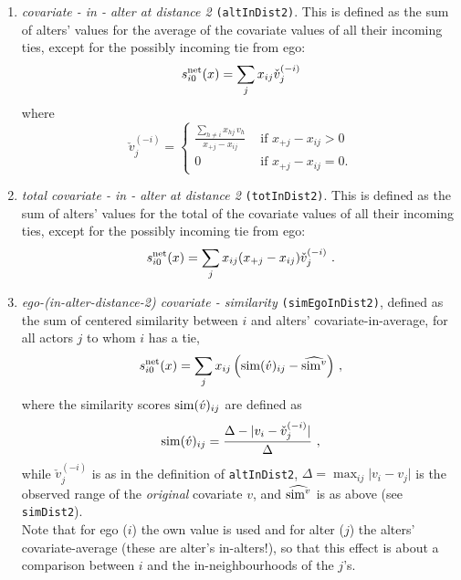 \documentclass[a4paper,fleqn,11pt]{article}
\newcommand{\+}{\, + \,}
\newcommand{\vit}{\theenumi}
\newcounter{savenumi}
\begin{document}
\begin{enumerate}
\item \emph{covariate - in - alter at distance 2} \texttt{(altInDist2)}.
     This is defined as the sum of alters' values for
     the average of the covariate values of all their
     incoming ties, except for the possibly incoming tie from ego:
\[
 s^{\rm net}_{i\vit}(x) = \sum_j x_{ij} \check v_j^{(-i)}
\]
      where
\begin{equation}
  \check v_j^{(-i)} = \left\{\begin{array}{ll} \displaystyle
         \frac{\sum_{h \neq i} x_{hj}\,v_h}{x_{+j} - x_{ij}}  &
                                       \text{ if } x_{+j} - x_{ij} > 0     \\
         0                                &  \text{ if } x_{+j}- x_{ij} = 0  .
  \end{array}   \right.            \label{alt_inav2}
\end{equation}


\item \emph{total covariate - in - alter at distance 2} \texttt{(totInDist2)}.
     This is defined as the sum of alters' values for
     the total of the covariate values of all their incoming ties,
     except for the possibly incoming tie from ego:
\[
 s^{\rm net}_{i\vit}(x) = \sum_j x_{ij} (x_{+j} - x_{ij}) \check v_j^{(-i)} \ .
\]

\item \emph{ego-(in-alter-distance-2) covariate - similarity} \texttt{(simEgoInDist2)},
      defined as the sum of centered similarity  between $i$
      and alters' covariate-in-average, for all actors
      $j$ to whom $i$ has a tie,
\[
 s^{\rm net}_{i\vit}(x) = \sum_j x_{ij}\, \Big({\rm sim}(\acute v)_{ij}
  - \widehat{{\rm sim}^v} \Big) \ ,
\]
 where the similarity scores ${\rm sim}(\acute v)_{ij}$ are defined as
\[
{\rm sim}(\acute v)_{ij}=
 \frac{\Delta-\vert  v_i - \check v_j^{(-i)} \vert}{\Delta} \ ,
\]
 while
 $ \check v_j^{(-i)}$ is as in the definition of \texttt{altInDist2},
 $\Delta=\max_{ij}\vert v_i - v_j \vert$ is the observed range of the
 \emph{original} covariate $v$, and $\widehat{{\rm sim}^v}$ is as above
 (see \texttt{simDist2}).\\
  Note that for ego ($i$) the own value is used and for alter ($j$) the alters' covariate-average
  (these are alter's in-alters!), so that this effect is about a comparison between $i$
   and the in-neighbourhoods of the $j$'s.

\setcounter{savenumi}{\value{enumi}}
\end{enumerate}
\end{document}
